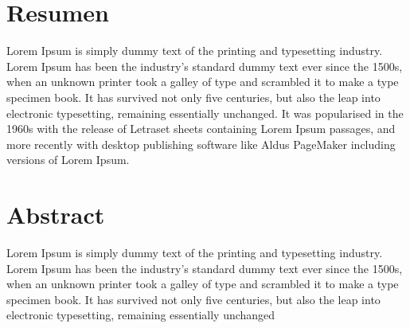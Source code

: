 \chapter*{Resumen} %

  Lorem Ipsum is simply dummy text of the printing and typesetting industry. Lorem
  Ipsum has been the industry's standard dummy text ever since the 1500s, when an
  unknown printer took a galley of type and scrambled it to make a type specimen book.
  It has survived not only five centuries, but also the leap into electronic typesetting,
  remaining essentially unchanged. It was popularised in the 1960s with the release of
  Letraset sheets containing Lorem Ipsum passages, and more recently with desktop
  publishing software like Aldus PageMaker including versions of Lorem Ipsum.

\clearpage

\chapter*{Abstract}

  Lorem Ipsum is simply dummy text of the printing and typesetting industry. Lorem
  Ipsum has been the industry's standard dummy text ever since the 1500s, when an
  unknown printer took a galley of type and scrambled it to make a type specimen book.
  It has survived not only five centuries, but also the leap into electronic typesetting,
  remaining essentially unchanged

